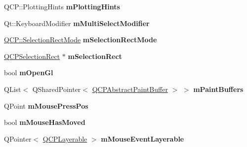 \begin{DoxyCompactItemize}
\item 
Q\+C\+P\+::\+Plotting\+Hints {\bfseries m\+Plotting\+Hints}\hypertarget{classQCustomPlot_aa184197a6101a9cc5807469e1d006c9e}{}\label{classQCustomPlot_aa184197a6101a9cc5807469e1d006c9e}

\item 
Qt\+::\+Keyboard\+Modifier {\bfseries m\+Multi\+Select\+Modifier}\hypertarget{classQCustomPlot_a0e97e701c5671e7e463d2ce0211d0f8a}{}\label{classQCustomPlot_a0e97e701c5671e7e463d2ce0211d0f8a}

\item 
\hyperlink{namespaceQCP_ac9aa4d6d81ac76b094f9af9ad2d3aacf}{Q\+C\+P\+::\+Selection\+Rect\+Mode} {\bfseries m\+Selection\+Rect\+Mode}\hypertarget{classQCustomPlot_abe04c5def373cc4fede8de20542ca3f2}{}\label{classQCustomPlot_abe04c5def373cc4fede8de20542ca3f2}

\item 
\hyperlink{classQCPSelectionRect}{Q\+C\+P\+Selection\+Rect} $\ast$ {\bfseries m\+Selection\+Rect}\hypertarget{classQCustomPlot_a4827bc84ef5ce52dfbf9ff630ed1b276}{}\label{classQCustomPlot_a4827bc84ef5ce52dfbf9ff630ed1b276}

\item 
bool {\bfseries m\+Open\+Gl}\hypertarget{classQCustomPlot_a0841dbea13bd120d20e3f0cc36767ff9}{}\label{classQCustomPlot_a0841dbea13bd120d20e3f0cc36767ff9}

\item 
Q\+List$<$ Q\+Shared\+Pointer$<$ \hyperlink{classQCPAbstractPaintBuffer}{Q\+C\+P\+Abstract\+Paint\+Buffer} $>$ $>$ {\bfseries m\+Paint\+Buffers}\hypertarget{classQCustomPlot_a57b270b1e3990e0d1b9fb39b137d5a5d}{}\label{classQCustomPlot_a57b270b1e3990e0d1b9fb39b137d5a5d}

\item 
Q\+Point {\bfseries m\+Mouse\+Press\+Pos}\hypertarget{classQCustomPlot_ac57090da95056ae4dd67be67adfa85bd}{}\label{classQCustomPlot_ac57090da95056ae4dd67be67adfa85bd}

\item 
bool {\bfseries m\+Mouse\+Has\+Moved}\hypertarget{classQCustomPlot_ad2108936f001a8be5974b0b6ff13dae3}{}\label{classQCustomPlot_ad2108936f001a8be5974b0b6ff13dae3}

\item 
Q\+Pointer$<$ \hyperlink{classQCPLayerable}{Q\+C\+P\+Layerable} $>$ {\bfseries m\+Mouse\+Event\+Layerable}\hypertarget{classQCustomPlot_a243867f445d2f4e35e00add2f589e1da}{}\label{classQCustomPlot_a243867f445d2f4e35e00add2f589e1da}


\end{DoxyCompactItemize}
